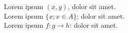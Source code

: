 \documentclass[varwidth=true]{standalone}
\begin{document}
Lorem ipsum $(x, y)$, dolor sit amet.\\
Lorem ipsum $\{x; x \in A\}$; dolor sit amet.\\
Lorem ipsum $f\colon g \to h$: dolor sit amet.
\end{document}
